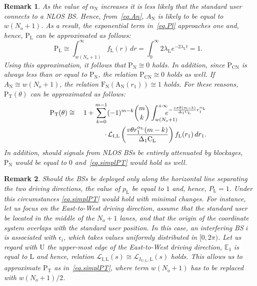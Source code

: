 \documentclass[10pt,journal,a4paper]{IEEEtran}
\newtheorem{remark}{Remark}[section]
\begin{document}
{\begin{remark}\label{r.app.gen}
As the value of $\alpha_{\mathrm{N}}$ increases it is less likely that the standard user connects to a NLOS BS. Hence, from~\eqref{eq.An}, $A_{\mathrm{N}}$ is likely to be equal to $w(N_o + 1)$. As a result, the exponential term in~\eqref{eq.Pl} approaches one and, hence, $\mathrm{P}_{\mathrm{L}}$ can be approximated as follows:
\begin{equation}
\mathrm{P}_{\mathrm{L}} \cong \int_{w(N_o+1)}^{\infty} f_\mathrm{L}(r) \,dr = \int_{0}^{\infty} 2 \lambda_{\mathrm{L}} e^{-2 \lambda_{\mathrm{L}} t} = 1.
\end{equation}
Using this approximation, it follows that \mbox{$\mathrm{P}_{\mathrm{N}} \cong 0$} holds. In addition, since $\mathrm{P}_{\mathrm{CN}}$ is always less than or equal to $\mathrm{P}_{\mathrm{N}}$, the relation $\mathrm{P}_\mathrm{CN} \cong 0$ holds as well. If \mbox{$A_{\mathrm{N}}\cong w(N_o + 1)$}, the relation $\mathrm{F}_\mathrm{N}(\mathrm{A}_\mathrm{N}(r_1))\cong 1$ holds.
For these reasons, $\mathrm{P}_{\mathrm{T}}(\theta)$ can be approximated as follows:
\setlength{\arraycolsep}{0.0em}
\begin{eqnarray}
\mathrm{P}_\mathrm{T}(\theta) &{}\cong{}& 1 + \sum_{k = 0}^{m-1}(-1)^{m-k}\binom{m}{k}\int_{w(N_o+1)}^{+\infty} \!\!\!\!\!\!\!\!\!\!\!\!e^{-\frac{v\sigma\theta(m-k)}{\Delta_1 \mathrm{C}_\mathrm{L}}r_1^{\alpha_\mathrm{L}}}\notag\\
&& \cdot \, \mathcal{L}_\mathrm{I,\mathrm{L}}\left(\frac{v\theta r_1^{\alpha_{\mathrm{L}}}(m-k)}{\Delta_1 \mathrm{C}_\mathrm{L}}\right) f_\mathrm{L}(r_1)  \, d r_1. \label{eq.simplPT}
\end{eqnarray}
In addition, should signals from NLOS BSs be entirely attenuated by blockages, $\mathrm{P}_{\mathrm{N}}$ would be equal to $0$ and~\eqref{eq.simplPT} would hold as well.
\end{remark}}

{\begin{remark}
Should the BSs be deployed only along the horizontal line separating the two driving directions, the value of $p_\mathrm{L}$ be equal to $1$ and, hence, $P_\mathrm{L} = 1$. Under this circumstances \eqref{eq.simplPT} would hold with minimal changes. For instance, let us focus on the East-to-West driving direction, assume that the standard user be located in the middle of the $N_o + 1$ lanes, and that the origin of the coordinate system overlaps with the standard user position. In this case, an interfering BS $i$ is associated with $\epsilon_i$, which takes values uniformly distributed in $[0, 2\pi)$. Let us regard with $\mathrm{U}$ the upper-most edge of the East-to-West driving direction, $\mathbb{E}_1$ is equal to $\mathrm{L}$ and hence, relation $\mathcal{L}_\mathrm{I,\mathrm{L}}(s) \cong \mathcal{L}_{I_{\mathrm{U},\mathrm{L}},\mathrm{L}}(s)$ holds. This allows us to approximate $\mathrm{P_T}$ as in~\eqref{eq.simplPT}, where term $w(N_o+1)$ has to be replaced with $w(N_o+1)/2$.
\end{remark}}
\end{document}
